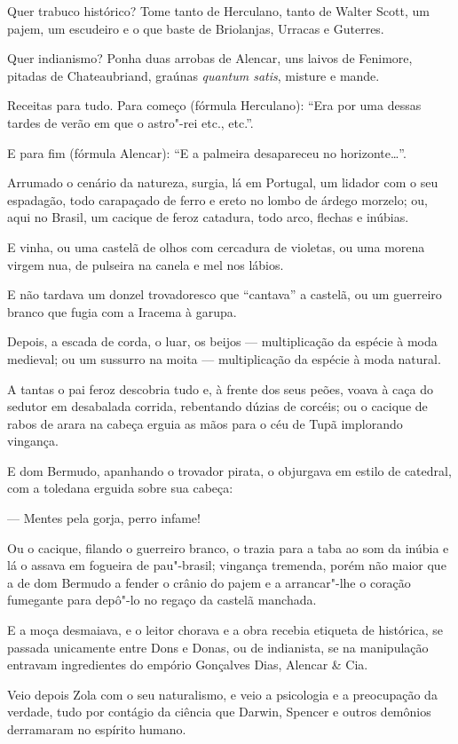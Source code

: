 Quer trabuco histórico? Tome tanto de Herculano, tanto de Walter Scott,
um pajem, um escudeiro e o que baste de Briolanjas, Urracas e Guterres.

Quer indianismo? Ponha duas arrobas de Alencar, uns laivos de Fenimore,
pitadas de Chateaubriand, graúnas \emph{quantum satis}, misture e mande.

Receitas para tudo. Para começo (fórmula Herculano): ``Era por uma
dessas tardes de verão em que o astro"-rei etc., etc.''.

E para fim (fórmula Alencar): ``E a palmeira desapareceu no
horizonte\ldots{}''.

Arrumado o cenário da natureza, surgia, lá em Portugal, um lidador com o
seu espadagão, todo carapaçado de ferro e ereto no lombo de árdego
morzelo; ou, aqui no Brasil, um cacique de feroz catadura, todo arco,
flechas e inúbias.

E vinha, ou uma castelã de olhos com cercadura de violetas, ou uma
morena virgem nua, de pulseira na canela e mel nos lábios.

E não tardava um donzel trovadoresco que ``cantava'' a castelã, ou um
guerreiro branco que fugia com a Iracema à garupa.

Depois, a escada de corda, o luar, os beijos --- multiplicação da
espécie à moda medieval; ou um sussurro na moita --- multiplicação da
espécie à moda natural.

A tantas o pai feroz descobria tudo e, à frente dos seus peões, voava à
caça do sedutor em desabalada corrida, rebentando dúzias de corcéis; ou
o cacique de rabos de arara na cabeça erguia as mãos para o céu de Tupã
implorando vingança.

E dom Bermudo, apanhando o trovador pirata, o objurgava em estilo de
catedral, com a toledana erguida sobre sua cabeça:

--- Mentes pela gorja, perro infame!

Ou o cacique, filando o guerreiro branco, o trazia para a taba ao som da
inúbia e lá o assava em fogueira de pau"-brasil; vingança tremenda, porém
não maior que a de dom Bermudo a fender o crânio do pajem e a
arrancar"-lhe o coração fumegante para depô"-lo no regaço da castelã
manchada.

E a moça desmaiava, e o leitor chorava e a obra recebia etiqueta de
histórica, se passada unicamente entre Dons e Donas, ou de indianista,
se na manipulação entravam ingredientes do empório Gonçalves Dias,
Alencar \& Cia.

Veio depois Zola com o seu naturalismo, e veio a psicologia e a
preocupação da verdade, tudo por contágio da ciência que Darwin, Spencer
e outros demônios derramaram no espírito humano.

